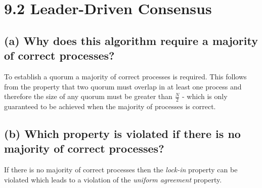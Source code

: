 \documentclass{article}
\begin{document}
	\section*{9.2 Leader-Driven Consensus}
	\begin{adjustwidth}{2em}{2em}
		\subsection*{(a) Why does this algorithm require a majority of correct processes?}
		\begin{adjustwidth}{2em}{2em}
			To establish a quorum a majority of correct processes is required. This follows from the property that two quorum must overlap in at least one process and therefore the size of any quorum must be greater than $\frac{N}{2}$ - which is only guaranteed to be achieved when the majority of processes is correct.
		\end{adjustwidth}
		\subsection*{(b) Which property is violated if there is no majority of correct processes?}
		\begin{adjustwidth}{2em}{2em}
			If there is no majority of correct processes then the \textit{lock-in} property can be violated which leads to a violation of the \textit{uniform agreement} property.
		\end{adjustwidth}

\end{adjustwidth}
\end{document}
